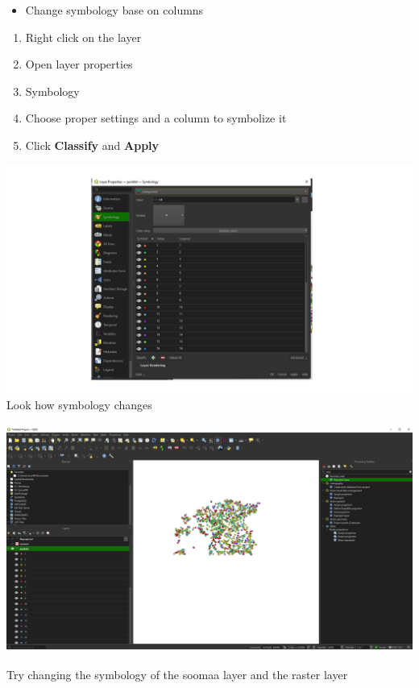 \documentclass[
  letterpaper,
  DIV=11,
  numbers=noendperiod]{scrartcl}
\providecommand{\tightlist}{%
  \setlength{\itemsep}{0pt}\setlength{\parskip}{0pt}}\usepackage{longtable,booktabs,array}
\begin{document}
\begin{itemize}
\tightlist
\item
  Change symbology base on columns
\end{itemize}

\begin{enumerate}
\def\labelenumi{\arabic{enumi})}
\tightlist
\item
  Right click on the layer
\item
  Open layer properties
\item
  Symbology
\item
  Choose proper settings and a column to symbolize it
\item
  Click \textbf{Classify} and \textbf{Apply}
\end{enumerate}

\includegraphics{Lab1/qgis_ss/QGIS_ss11.png} Look how symbology changes

\includegraphics{Lab1/qgis_ss/QGIS_ss12.png}

Try changing the symbology of the soomaa layer and the raster layer
\end{document}
